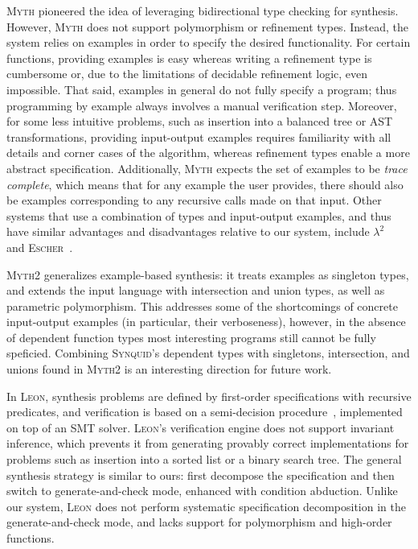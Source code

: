 \documentclass[10pt,preprint]{sigplanconf-pldi16}
\theoremstyle{definition}
\newcommand{\lang}{\textsc{Synquid}\xspace}
\begin{document}
\textsc{Myth} pioneered the idea of leveraging bidirectional type checking for synthesis. 
However, \textsc{Myth} does not support polymorphism or refinement types. 
Instead, the system relies on examples in order to specify the desired functionality. 
For certain functions, providing examples is easy
whereas writing a refinement type is cumbersome or, due to the limitations of decidable refinement logic, even impossible.
That said, examples in general do not fully specify a program;
thus programming by example always involves a manual verification step. 
Moreover, for some less intuitive problems, such as insertion into a balanced tree or AST transformations,
providing input-output examples requires familiarity with all details and corner cases of the algorithm,
whereas refinement types enable a more abstract specification.
Additionally, \textsc{Myth} expects the set of examples to be \emph{trace complete}, 
which means that for any example the user provides, there should also be examples corresponding to any recursive calls made on that input. 
Other systems that use a combination of types and input-output examples,
and thus have similar advantages and disadvantages relative to our system,
include $\lambda^2$~\cite{FeserChDi15} and \textsc{Escher}~\cite{AlbarghouthiGuKi13}.

\textsc{Myth2} generalizes example-based synthesis: 
it treats examples as singleton types, and extends the input language with intersection and union types, as well as parametric polymorphism.
This addresses some of the shortcomings of concrete input-output examples (in particular, their verboseness),
however, in the absence of dependent function types most interesting programs still cannot be fully speficied.
Combining \lang's dependent types with singletons, intersection, and unions found in \textsc{Myth2}
is an interesting direction for future work.

In \textsc{Leon}, synthesis problems are defined by first-order specifications with recursive predicates,
and verification is based on a semi-decision procedure~\cite{SuterKoKu11}, implemented on top of an SMT solver.
\textsc{Leon}'s verification engine does not support invariant inference,
which prevents it from generating provably correct implementations for problems such as insertion into a sorted list or a binary search tree.
The general synthesis strategy is similar to ours:
first decompose the specification 
and then switch to generate-and-check mode, enhanced with condition abduction. 
Unlike our system, \textsc{Leon} does not perform systematic specification decomposition in the generate-and-check mode,
and lacks support for polymorphism and high-order functions.
\end{document}
